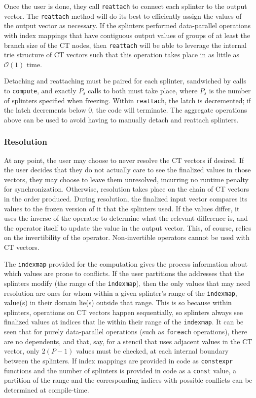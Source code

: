 \documentclass[pageno]{jpaper}
\begin{document}
Once the user is done, they call \texttt{reattach} to connect each splinter to the output 
vector. The \texttt{reattach} method will do its best to efficiently assign the values 
of the output vector as necessary. If the splinters performed data-parallel operations 
with index mappings that have contiguous output values of groups of at least the branch size 
of the CT nodes, then \texttt{reattach} will be able to leverage the internal trie 
structure of CT vectors such that this operation takes place in as little as $\mathcal{O}(1)$
time.

Detaching and reattaching must be paired for each splinter, sandwiched by calls to
\texttt{compute}, and exactly $P_s$ calls to both must take 
place, where $P_s$ is the number of splinters specified when freezing. Within 
\texttt{reattach}, the latch is decremented; if the latch decrements below 0, the code 
will terminate. The aggregate operations above can be used to avoid having to
manually detach and reattach splinters.

\subsubsection{Resolution}
At any point, the user may choose to never resolve the CT vectors if desired. If the 
user decides that they do not actually care to see the finalized values in those 
vectors, they may choose to leave them unresolved, incurring no runtime penalty for 
synchronization. Otherwise, resolution takes place on the chain of CT vectors
in the order produced. During resolution, the finalized input vector compares its values to the 
frozen version of it that the splinters used. If the values differ, it uses the inverse
of the operator to determine what the relevant difference is, and the operator itself to
update the value in the output vector. This, of course, relies on the invertibility of 
the operator. Non-invertible operators cannot be used with CT vectors.

The \texttt{indexmap} provided for the computation gives the process information
about which values are prone to conflicts. If the user partitions the addresses
that the splinters modify (the range of the \texttt{indexmap}), then the only
values that may need resolution are ones for whom within a given splinter's
range of the \texttt{indexmap}, value(s) in their domain lie(s) outside that
range. This is so because within splinters, operations on CT vectors happen
sequentially, so splinters always see finalized values at indices that lie
within their range of the \texttt{indexmap}. It can be seen that for purely
data-parallel operations (such as \texttt{foreach} operations), there are no
dependents, and that, say, for a stencil that uses adjacent values in the CT
vector, only $2(P-1)$ values must be checked, at each internal boundary between
the splinters. If index mappings are provided in code as \texttt{constexpr}
functions and the number of splinters is provided in code as a \texttt{const}
value, a partition of the range and the corresponding indices with possible
conflicts can be determined at compile-time.
\end{document}
